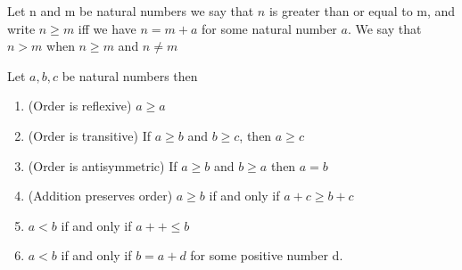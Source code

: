 \documentclass[11pt]{report}
\begin{document}
\begin{definition}[Order]
	Let n and m be natural numbers we say that $n$ is greater than or equal to m, and write $n \geq m$ iff we have $n = m + a$ for some natural number $a$. We say that $n > m$ when $n \geq m$ and $n \neq m$
\end{definition}
\break
\begin{prop}
	Let $a,b,c$ be natural numbers then
	\begin{enumerate}
		\item (Order is reflexive) $a \geq a$
		\item (Order is transitive) If $a \geq b$ and $b \geq c$, then $a \geq c$
		\item (Order is antisymmetric) If $a \geq b$ and $b \geq a$ then $a=b$
		\item (Addition preserves order) $a \geq b$ if and only if $a+c \geq b+c$
		\item $a<b$ if and only if $a++ \leq b$
		\item $a<b$ if and only if $b= a+d$ for some positive number d.
	\end{enumerate}
\end{prop}
\end{document}
